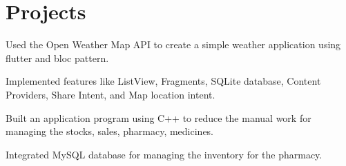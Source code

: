 \documentclass[letterpaper]{deedy-resume} %
\begin{document}
\begin{minipage}[t]{0.66\textwidth}
\sectionspace %






\section{Projects}


\begin{tightitemize}
\item Used the Open Weather Map API to create a simple weather application using flutter and bloc pattern.
\item Implemented features like ListView, Fragments, SQLite database, Content Providers, Share Intent, and Map location intent.
\end{tightitemize}

\sectionspace %



\begin{tightitemize}
\item Built an application program using C++ to reduce the manual work for managing the stocks, sales, pharmacy, medicines.
\item Integrated MySQL database for managing the inventory for the pharmacy.
\end{tightitemize}


\end{minipage}
\end{document}
